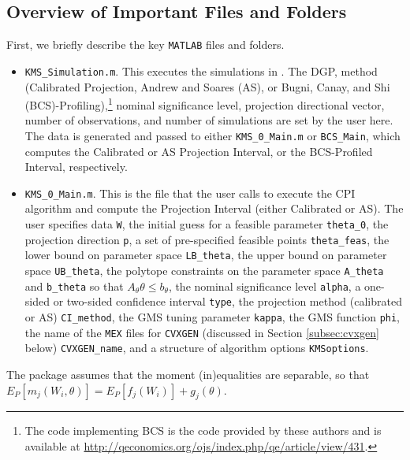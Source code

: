 \documentclass[12pt]{article}
\def\code#1{\texttt{#1}}
\begin{document}
\subsection{Overview of Important Files and Folders}\label{sec:overview}
First, we briefly describe the key \code{MATLAB} files and folders.
\begin{itemize}
\item \code{KMS\_Simulation.m}.  This executes the simulations in  .  The DGP, method (Calibrated Projection, Andrew and Soares (AS), or Bugni, Canay, and Shi (BCS)-Profiling),\footnote{The code implementing BCS is the code provided by these authors and is available at \url{http://qeconomics.org/ojs/index.php/qe/article/view/431}.} nominal significance level, projection directional vector, number of observations, and number of simulations are set by the user here.  The data is generated and passed to either \code{KMS\_0\_Main.m} or \code{BCS\_Main}, which computes the Calibrated or AS Projection Interval, or the BCS-Profiled Interval, respectively.

\item \code{KMS\_0\_Main.m}.  This is the file that the user calls to execute the CPI algorithm and compute the Projection Interval (either Calibrated or AS).  The user specifies data \code{W}, the initial guess for a feasible parameter \code{theta\_0}, the projection direction \code{p}, a set of pre-specified feasible points \code{theta\_feas}, the lower bound on parameter space \code{LB\_theta}, the upper bound on parameter space \code{UB\_theta},  the polytope constraints on the parameter space \code{A\_theta} and \code{b\_theta} so that $A_{\theta} \theta \leq b_{\theta}$, the nominal significance level \code{alpha}, a one-sided or two-sided confidence interval \code{type}, the projection method (calibrated or AS) \code{CI\_method}, the GMS tuning parameter \code{kappa}, the GMS function \code{phi}, the name of the \code{MEX} files for \code{CVXGEN} (discussed in Section \ref{subsec:cvxgen} below) \code{CVXGEN\_name}, and a structure of algorithm options \code{KMSoptions}.
\end{itemize}
 The package assumes that the moment (in)equalities are separable, so that $E_P[m_j(W_i,\theta)] = E_P[f_j(W_i)] + g_j(\theta)$.
\end{document}
